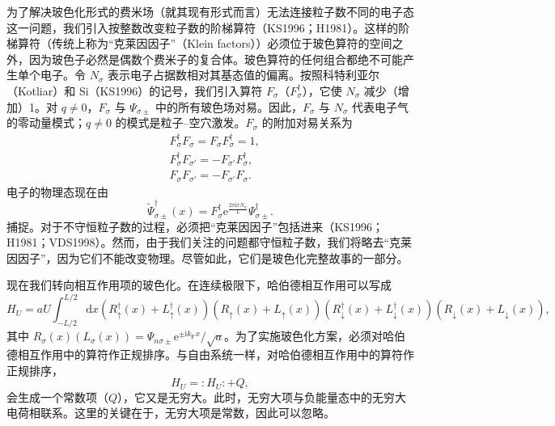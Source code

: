 为了解决玻色化形式的费米场（就其现有形式而言）无法连接粒子数不同的电子态这一问题，我们引入按整数改变粒子数的阶梯算符（KS1996；H1981）。这样的阶梯算符（传统上称为“克莱因因子”（Klein factors））必须位于玻色算符的空间之外，因为玻色子必然是偶数个费米子的复合体。玻色算符的任何组合都绝不可能产生单个电子。令 $N_{\sigma}$ 表示电子占据数相对其基态值的偏离。按照科特利亚尔（Kotliar）和 Si（KS1996）的记号，我们引入算符 $F_{\sigma}$（$F_{\sigma}^{\dagger}$），它使 $N_{\sigma}$ 减少（增加）1。对 $q\neq 0$，$F_{\sigma}$ 与 $\Psi_{\sigma\pm}$ 中的所有玻色场对易。因此，$F_{\sigma}$ 与 $N_{\sigma}$ 代表电子气的零动量模式；$q\neq 0$ 的模式是粒子–空穴激发。$F_{\sigma}$ 的附加对易关系为
\begin{align*}
&F_{\sigma}^{\dagger}F_{\sigma}=F_{\sigma}F_{\sigma}^{\dagger}=1,\\
&F_{\sigma}^{\dagger}F_{\sigma'}=-F_{\sigma'}F_{\sigma}^{\dagger},\\
&F_{\sigma}F_{\sigma'}=-F_{\sigma'}F_{\sigma}.
\tag{10.33}
\end{align*}
电子的物理态现在由
\begin{equation*}
\tilde{\Psi}_{\sigma\pm}^{\dagger}(x)=F_{\sigma}^{\dagger}\mathrm{e}^{\frac{2\pi\mathrm{i}xN_{\sigma}}{L}}\Psi_{\sigma\pm}^{\dagger}.
\tag{10.34}
\end{equation*}
捕捉。对于不守恒粒子数的过程，必须把“克莱因因子”包括进来（KS1996；H1981；VDS1998）。然而，由于我们关注的问题都守恒粒子数，我们将略去“克莱因因子”，因为它们不能改变物理。尽管如此，它们是玻色化完整故事的一部分。

现在我们转向相互作用项的玻色化。在连续极限下，哈伯德相互作用可以写成
\begin{equation*}
H_{U}=aU\int_{-L/2}^{L/2}\mathrm{d}x\left(R_{\uparrow}^{\dagger}(x)+L_{\uparrow}^{\dagger}(x)\right)\left(R_{\uparrow}(x)+L_{\uparrow}(x)\right)\left(R_{\downarrow}^{\dagger}(x)+L_{\downarrow}^{\dagger}(x)\right)\left(R_{\downarrow}(x)+L_{\downarrow}(x)\right),
\tag{10.35}
\end{equation*}
其中 $R_{\sigma}(x)(L_{\sigma}(x))=\Psi_{n\sigma\pm}\mathrm{e}^{\pm\mathrm{i}k_{\mathrm{F}}x}/\sqrt{a}$。为了实施玻色化方案，必须对哈伯德相互作用中的算符作正规排序。与自由系统一样，对哈伯德相互作用中的算符作正规排序，
\begin{equation*}
H_{U}=:H_{U}:+Q,
\tag{10.36}
\end{equation*}
会生成一个常数项（$Q$），它又是无穷大。此时，无穷大项与负能量态中的无穷大电荷相联系。这里的关键在于，无穷大项是常数，因此可以忽略。

